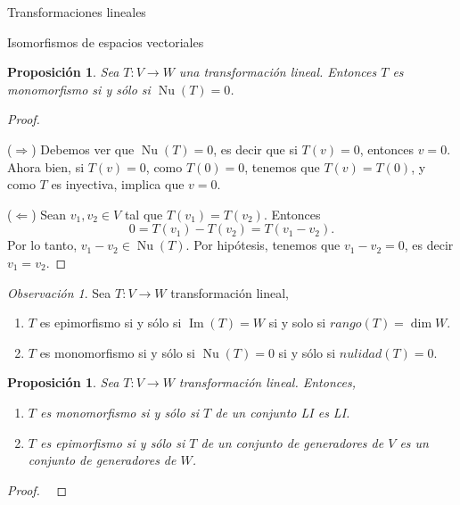 \documentclass[a4paper,12pt,twoside,spanish,reqno]{amsbook}
\numberwithin{equation}{section}
\newtheorem{proposicion}[teorema]{Proposici\'on}
\theoremstyle{definition}
\theoremstyle{remark}
\newtheorem*{obs*}{Observaci\'on}
\newcommand{\img}{\operatorname{Im}}
\newcommand{\nuc}{\operatorname{Nu}}
\begin{document}
\begin{chapter}{Transformaciones lineales}
\begin{section}{Isomorfismos de espacios vectoriales}
        \begin{proposicion}\label{inyectiva-sii-nuT=0}
            Sea $T:V \to W$ una transformación lineal. Entonces $T$ es monomorfismo si y sólo si $\nuc(T) =0$.
        \end{proposicion}	
        \begin{proof} 
            
            \
            
            ($\Rightarrow$) Debemos ver que  $\nuc(T)=0$,  es decir que si $T(v)=0$,  entonces  $v=0$. Ahora bien,  si $T(v) = 0$, como  $T(0)=0$, tenemos que $T(v)  = T(0)$, y como $T$ es inyectiva, implica que $v =0$.
            
            ($\Leftarrow$) Sean  $v_1,v_2 \in V$ tal que $T(v_1)=T(v_2)$. Entonces 
            $$
            0 = T(v_1)- T(v_2) = T(v_1 -v_2).
            $$
            Por  lo tanto, $v_1 -v_2 \in \nuc(T)$. Por hipótesis, tenemos que $v_1 -v_2 =0$,  es decir $v_1 = v_2$.
        \end{proof}
        
        
        \begin{obs*} Sea $T: V \to W$ transformación lineal, 
            \begin{enumerate}
                \item $T$  es {epimorfismo} si y sólo  si $\img(T) = W$ si  y solo si $rango(T) = \dim W$.
                \item $T$ es {monomorfismo} si y sólo  si $\nuc(T) = 0$ si y sólo si $nulidad(T) =0$.
            \end{enumerate}  
        \end{obs*}		
        
        \begin{proposicion}\label{prop-T-mono-sii-li-2-li} Sea $T:V \to W$ transformación lineal. Entonces,
            \begin{enumerate}
                \item\label{itm-T-mono-sii} $T$ es monomorfismo si y sólo si $T$ de un conjunto LI  es  LI.
                \item\label{itm-T-epi-sii} $T$ es epimorfismo si y sólo si $T$ de un conjunto de generadores de $V$ es un conjunto de generadores de $W$.
            \end{enumerate}
        \end{proposicion}
        \begin{proof}
            
            \
            

\end{proof}
\end{section}
\end{chapter}
\end{document}
